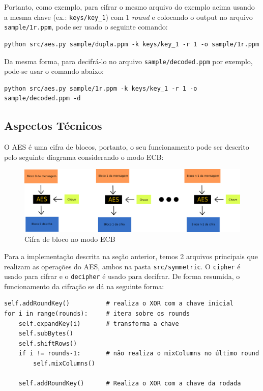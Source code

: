 \documentclass[12pt]{article}
\begin{document}
Portanto, como exemplo, para cifrar o mesmo arquivo do exemplo acima usando a mesma chave (ex.: \texttt{keys/key\_1}) com 1 \textit{round} e colocando o output no arquivo \texttt{sample/1r.ppm}, pode ser usado o seguinte comando:

\begin{lstlisting}
python src/aes.py sample/dupla.ppm -k keys/key_1 -r 1 -o sample/1r.ppm
\end{lstlisting}

Da mesma forma, para decifrá-lo no arquivo \texttt{sample/decoded.ppm} por exemplo, pode-se usar o comando abaixo:

\begin{lstlisting}
python src/aes.py sample/1r.ppm -k keys/key_1 -r 1 -o sample/decoded.ppm -d
\end{lstlisting}

\subsection{Aspectos Técnicos}
O AES é uma cifra de blocos, portanto, o seu funcionamento pode ser descrito pelo seguinte diagrama considerando o modo ECB:

\begin{figure}[H]
	\centering
    \includegraphics[width=\textwidth]{img/ecb.png}
    \caption{Cifra de bloco no modo ECB}
\end{figure}

Para a implementação descrita na seção anterior, temos 2 arquivos principais que realizam as operações do AES, ambos na pasta \texttt{src/symmetric}. O \texttt{cipher} é usado para cifrar e o \texttt{decipher} é usado para decifrar. De forma resumida, o funcionamento da cifração se dá na seguinte forma:

\begin{lstlisting}
self.addRoundKey()          # realiza o XOR com a chave inicial
for i in range(rounds):     # itera sobre os rounds
    self.expandKey(i)       # transforma a chave
    self.subBytes()
    self.shiftRows()
    if i != rounds-1:       # não realiza o mixColumns no último round
        self.mixColumns()
    
    self.addRoundKey()      # Realiza o XOR com a chave da rodada
\end{lstlisting}
\end{document}
